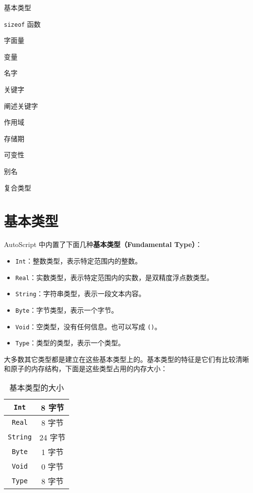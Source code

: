 \begin{introduction}
    \item 基本类型
    \item \lstinline!sizeof! 函数
    \item 字面量
    \item 变量
    \item 名字
    \item 关键字
    \item 阐述关键字
    \item 作用域
    \item 存储期
    \item 可变性
    \item 别名
    \item 复合类型
\end{introduction}


\section{基本类型}

AutoScript 中内置了下面几种\textbf{基本类型（Fundamental Type）}：

\begin{itemize}
    \item \lstinline!Int!：整数类型，表示特定范围内的整数。
    \item \lstinline!Real!：实数类型，表示特定范围内的实数，是双精度浮点数类型。
    \item \lstinline!String!：字符串类型，表示一段文本内容。
    \item \lstinline!Byte!：字节类型，表示一个字节。
    \item \lstinline!Void!：空类型，没有任何信息。也可以写成 \lstinline!()!。
    \item \lstinline!Type!：类型的类型，表示一个类型。
\end{itemize}

大多数其它类型都是建立在这些基本类型上的。基本类型的特征是它们有比较清晰和原子的内存结构，下面是这些类型占用的内存大小：

\begin{table}[h]
    \centering
    \begin{tabular}{|c|c|} \hline
        \lstinline!Int! & 8 字节  \\\hline
        \lstinline!Real! & 8 字节 \\\hline 
        \lstinline!String! & 24 字节 \\\hline
        \lstinline!Byte! & 1 字节 \\\hline
        \lstinline!Void! & 0 字节 \\\hline
        \lstinline!Type! & 8 字节 \\\hline
    \end{tabular}
    \caption{基本类型的大小}
    \label{tab:sizeof-fundamental-type}
\end{table}

